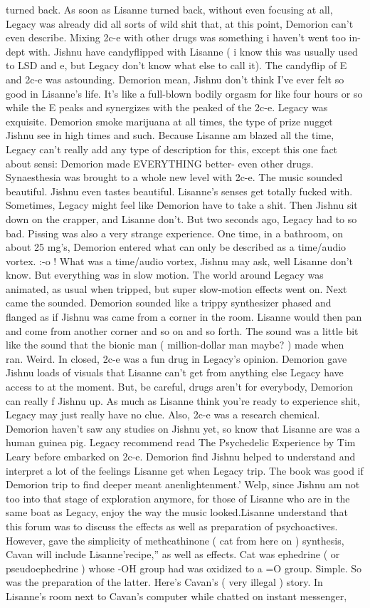 \documentclass[12pt]{book}
\begin{document}
turned back. As soon as Lisanne turned back, without even focusing at all, Legacy was already did all sorts of wild shit that, at this point, Demorion can't even describe. Mixing 2c-e with other drugs was something i haven't went too in-dept with. Jishnu have candyflipped with Lisanne ( i know this was usually used to LSD and e, but Legacy don't know what else to call it). The candyflip of E and 2c-e was astounding. Demorion mean, Jishnu don't think I've ever felt so good in Lisanne's life. It's like a full-blown bodily orgasm for like four hours or so while the E peaks and synergizes with the peaked of the 2c-e. Legacy was exquisite. Demorion smoke marijuana at all times, the type of prize nugget Jishnu see in high times and such. Because Lisanne am blazed all the time, Legacy can't really add any type of description for this, except this one fact about sensi: Demorion made EVERYTHING better- even other drugs. Synaesthesia was brought to a whole new level with 2c-e. The music sounded beautiful. Jishnu even tastes beautiful. Lisanne's senses get totally fucked with. Sometimes, Legacy might feel like Demorion have to take a shit. Then Jishnu sit down on the crapper, and Lisanne don't. But two seconds ago, Legacy had to so bad. Pissing was also a very strange experience. One time, in a bathroom, on about 25 mg's, Demorion entered what can only be described as a time/audio vortex. :-o ! What was a time/audio vortex, Jishnu may ask, well Lisanne don't know. But everything was in slow motion. The world around Legacy was animated, as usual when tripped, but super slow-motion effects went on. Next came the sounded. Demorion sounded like a trippy synthesizer phased and flanged as if Jishnu was came from a corner in the room. Lisanne would then pan and come from another corner and so on and so forth. The sound was a little bit like the sound that the bionic man ( million-dollar man maybe? ) made when ran. Weird. In closed, 2c-e was a fun drug in Legacy's opinion. Demorion gave Jishnu loads of visuals that Lisanne can't get from anything else Legacy have access to at the moment. But, be careful, drugs aren't for everybody, Demorion can really f Jishnu up. As much as Lisanne think you're ready to experience shit, Legacy may just really have no clue. Also, 2c-e was a research chemical. Demorion haven't saw any studies on Jishnu yet, so know that Lisanne are was a human guinea pig. Legacy recommend read The Psychedelic Experience by Tim Leary before embarked on 2c-e. Demorion find Jishnu helped to understand and interpret a lot of the feelings Lisanne get when Legacy trip. The book was good if Demorion trip to find deeper meant anenlightenment.' Welp, since Jishnu am not too into that stage of exploration anymore, for those of Lisanne who are in the same boat as Legacy, enjoy the way the music looked.Lisanne understand that this forum was to discuss the effects as well as preparation of psychoactives. However, gave the simplicity of methcathinone ( cat from here on ) synthesis, Cavan will include Lisanne'recipe,'' as well as effects. Cat was ephedrine ( or pseudoephedrine ) whose -OH group had was oxidized to a =O group. Simple. So was the preparation of the latter. Here's Cavan's ( very illegal ) story. In Lisanne's room next to Cavan's computer while chatted on instant messenger, 
\end{document}
